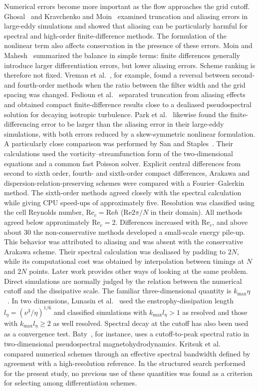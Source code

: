 \documentclass[11pt,a4paper]{article}
\newcommand{\Rey}{\mathrm{Re}}
\begin{document}
Numerical errors become more important as the flow approaches the grid cutoff. Ghosal~\cite{ghosal1996} and Kravchenko and Moin~\cite{kravchenko1997} examined truncation and aliasing errors in large-eddy simulations and showed that aliasing can be particularly harmful for spectral and high-order finite-difference methods. The formulation of the nonlinear term also affects conservation in the presence of these errors. Moin and Mahesh~\cite{moin1998} summarized the balance in simple terms: finite differences generally introduce larger differentiation errors, but lower aliasing errors. Scheme ranking is therefore not fixed. Vreman et al.~\cite{vreman1996}, for example, found a reversal between second- and fourth-order methods when the ratio between the filter width and the grid spacing was changed. Fedioun et al.~\cite{fedioun2001} separated truncation from aliasing effects and obtained compact finite-difference results close to a dealiased pseudospectral solution for decaying isotropic turbulence. Park et al.~\cite{park2004} likewise found the finite-differencing error to be larger than the aliasing error in their large-eddy simulations, with both errors reduced by a skew-symmetric nonlinear formulation.
A particularly close comparison was performed by San and Staples~\cite{san2012}. Their calculations used the vorticity--streamfunction form of the two-dimensional equations and a common fast Poisson solver. Explicit central differences from second to sixth order, fourth- and sixth-order compact differences, Arakawa and dispersion-relation-preserving schemes were compared with a Fourier--Galerkin method. The sixth-order methods agreed closely with the spectral calculation while giving CPU speed-ups of approximately five. Resolution was classified using the cell Reynolds number, $\Rey_c=\Rey h$ ($\Rey 2\pi/N$ in their domain). All methods agreed below approximately $\Rey_c=2$. Differences increased with $\Rey_c$, and above about $30$ the non-conservative methods developed a small-scale energy pile-up. This behavior was attributed to aliasing and was absent with the conservative Arakawa scheme. Their spectral calculation was dealiased by padding to $2N$, while its computational cost was obtained by interpolation between timings at $N$ and $2N$ points.
Later work provides other ways of looking at the same problem. Direct simulations are normally judged by the relation between the numerical cutoff and the dissipative scale. The familiar three-dimensional quantity is $k_{\max}\eta$~\cite{yeung2018}. In two dimensions, Lunasin et al.~\cite{lunasin2007} used the enstrophy-dissipation length $l_\eta=(\nu^3/\eta)^{1/6}$ and classified simulations with $k_{\max}l_\eta>1$ as resolved and those with $k_{\max}l_\eta\ge2$ as well resolved. Spectral decay at the cutoff has also been used as a convergence test. Baty~\cite{baty2026}, for instance, uses a cutoff-to-peak spectral ratio in two-dimensional pseudospectral magnetohydrodynamics. Kritsuk et al.~\cite{kritsuk2011} compared numerical schemes through an effective spectral bandwidth defined by agreement with a high-resolution reference. In the structured search performed for the present study, no previous use of these quantities was found as a criterion for selecting among differentiation schemes.
\end{document}
